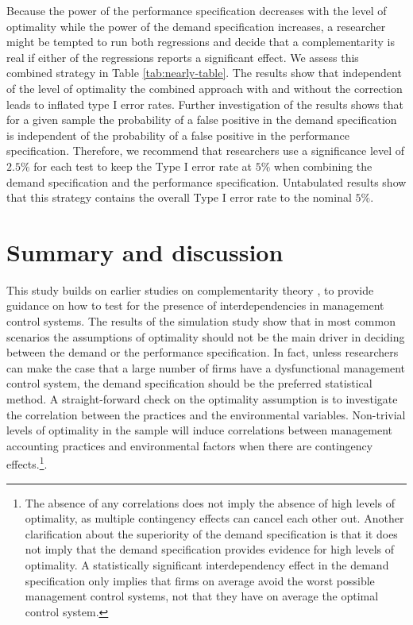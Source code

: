 \documentclass[12pt]{article}
\begin{document}
Because the power of the performance specification decreases with the level of optimality while the power of the demand specification increases, a researcher might be tempted to run both regressions and decide that a complementarity is real if either of the regressions reports a significant effect. We assess this combined strategy in Table \ref{tab:nearly-table}. The results show that independent of the level of optimality the combined approach with and without the correction leads to inflated type I error rates. Further investigation of the results shows that for a given sample the probability of a false positive in the demand specification is independent of the probability of a false positive in the performance specification.  Therefore, we recommend that researchers use a significance level of $2.5\%$ for each test to keep the Type I error rate at $5\%$ when combining the demand specification and the performance specification. Untabulated results show that this strategy contains the overall Type I error rate to the nominal $5\%$.

\section{Summary and discussion}\label{summary-and-discussion}

This study builds on earlier studies on complementarity theory \citep{milgrom_complementarities_1995, grabner_management_2013}, to provide guidance on how to test for the presence of interdependencies in management control systems. The results of the simulation study show that in most common scenarios the assumptions of optimality should not be the main driver in deciding between the demand or the performance specification. In fact, unless researchers can make the case that a large number of firms have a dysfunctional management control system, the demand specification should be the preferred statistical method. A straight-forward check on the optimality assumption is to investigate the correlation between the practices and the environmental variables. Non-trivial levels of optimality in the sample will induce correlations between management accounting practices and environmental factors when there are contingency effects.\footnote{The absence of any correlations does not imply the absence of high levels of optimality, as multiple contingency effects can cancel each other out. Another clarification about the superiority of the demand specification is that it does not imply that the demand specification provides evidence for high levels of optimality. A statistically significant interdependency effect in the demand specification only implies that firms on average avoid the worst possible management control systems, not that they have on average the optimal control system.}.
\end{document}
